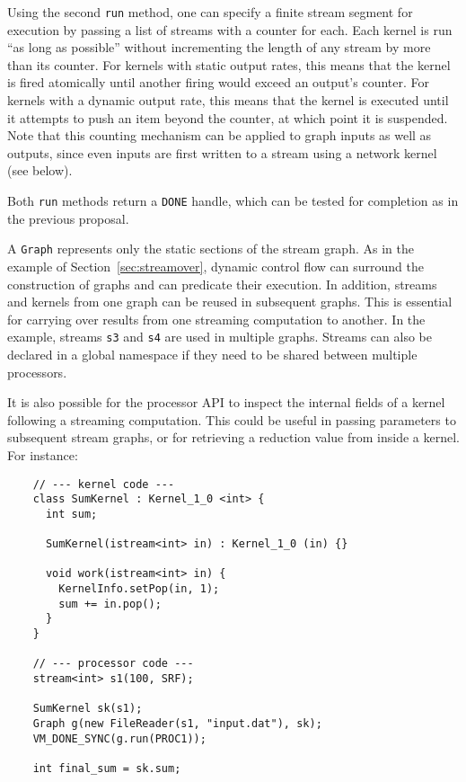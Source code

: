 Using the second {\tt run} method, one can specify a finite stream
segment for execution by passing a list of streams with a counter for
each.  Each kernel is run ``as long as possible'' without incrementing
the length of any stream by more than its counter.  For kernels with
static output rates, this means that the kernel is fired atomically
until another firing would exceed an output's counter.  For kernels
with a dynamic output rate, this means that the kernel is executed
until it attempts to push an item beyond the counter, at which point
it is suspended.  Note that this counting mechanism can be applied to
graph inputs as well as outputs, since even inputs are first written
to a stream using a network kernel (see below).

Both {\tt run} methods return a {\tt DONE} handle, which can be tested
for completion as in the previous proposal.


A {\tt Graph} represents only the static sections of the stream graph.
As in the example of Section~\ref{sec:streamover}, dynamic control
flow can surround the construction of graphs and can predicate their
execution.  In addition, streams and kernels from one graph can be
reused in subsequent graphs.  This is essential for carrying over
results from one streaming computation to another.  In the example,
streams {\tt s3} and {\tt s4} are used in multiple graphs.  Streams
can also be declared in a global namespace if they need to be shared
between multiple processors.

It is also possible for the processor API to inspect the internal
fields of a kernel following a streaming computation.  This could be
useful in passing parameters to subsequent stream graphs, or for
retrieving a reduction value from inside a kernel.  For instance:
{\small
\begin{verbatim}
    // --- kernel code ---
    class SumKernel : Kernel_1_0 <int> {
      int sum;

      SumKernel(istream<int> in) : Kernel_1_0 (in) {}

      void work(istream<int> in) {
        KernelInfo.setPop(in, 1);
        sum += in.pop();
      }
    }

    // --- processor code ---
    stream<int> s1(100, SRF);

    SumKernel sk(s1);
    Graph g(new FileReader(s1, "input.dat"), sk);
    VM_DONE_SYNC(g.run(PROC1));

    int final_sum = sk.sum;
\end{verbatim}}

